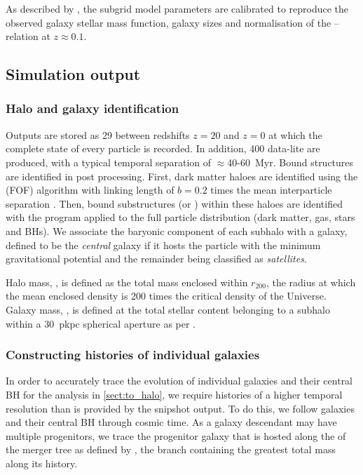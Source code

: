 As described by \citet{Crain2015}, the subgrid model parameters are calibrated
to reproduce the observed galaxy stellar mass function, galaxy sizes and
normalisation of the -- relation at $z \approx 0.1$.

\subsection{Simulation output}

\subsubsection{Halo and galaxy identification}

Outputs are stored as 29  between redshifts $z=20$ and $z=0$
at which the complete state of every particle is recorded. In addition, 400
data-lite  are produced, with a typical temporal separation
of $\approx$40-60~Myr. Bound structures are identified in post processing.
First, dark matter haloes are identified using the 
(FOF) algorithm with linking length of $b = 0.2$ times the mean interparticle
separation \citep{Davis1985}.  Then, bound substructures (or
) within these haloes are identified with the \subfind
program \citep{Springel2001,Dolag2009} applied to the full particle
distribution (dark matter, gas, stars and BHs). We associate the baryonic
component of each subhalo with a galaxy, defined to be the \textit{central}
galaxy if it hosts the particle with the minimum gravitational potential and
the remainder being classified as \textit{satellites}.

Halo mass, , is defined as the total mass enclosed within
$r_{\mathrm{200}}$, the radius at which the mean enclosed density is 200 times
the critical density of the Universe. Galaxy mass, \M{*}, is defined at the
total stellar content belonging to a subhalo within a 30~pkpc spherical
aperture as per \citet{Schaye2015}. 

\subsubsection{Constructing histories of individual galaxies}
\label{sect:individual_galaxies}

In order to accurately trace the evolution of individual galaxies and their
central BH for the analysis in \cref{sect:to_halo}, we require histories of a
higher temporal resolution than is provided by the snipshot output. To do this,
we follow galaxies and their central BH through cosmic time. As a galaxy
descendant may have multiple progenitors, we trace the progenitor galaxy that
is hosted along the  of the merger tree as
defined by \citet{Qu2017}, the branch containing the greatest total mass along
its history.  

